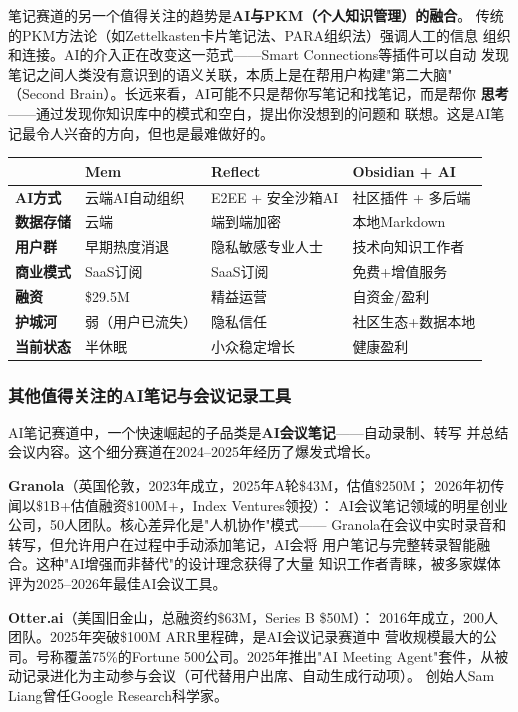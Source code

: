 笔记赛道的另一个值得关注的趋势是\textbf{AI与PKM（个人知识管理）的融合}。
传统的PKM方法论（如Zettelkasten卡片笔记法、PARA组织法）强调人工的信息
组织和连接。AI的介入正在改变这一范式——Smart Connections等插件可以自动
发现笔记之间人类没有意识到的语义关联，本质上是在帮用户构建"第二大脑"
（Second Brain）。长远来看，AI可能不只是帮你写笔记和找笔记，而是帮你
\textbf{思考}——通过发现你知识库中的模式和空白，提出你没想到的问题和
联想。这是AI笔记最令人兴奋的方向，但也是最难做好的。

\begin{keybox}[AI笔记工具对比]
\small
\begin{tabularx}{\textwidth}{l X X X}
\toprule
\rowcolor{figLightGray}
& \textbf{Mem} & \textbf{Reflect} & \textbf{Obsidian + AI} \\
\midrule
\textbf{AI方式} & 云端AI自动组织 & E2EE + 安全沙箱AI & 社区插件 + 多后端 \\
\textbf{数据存储} & 云端 & 端到端加密 & 本地Markdown \\
\textbf{用户群} & 早期热度消退 & 隐私敏感专业人士 & 技术向知识工作者 \\
\textbf{商业模式} & SaaS订阅 & SaaS订阅 & 免费+增值服务 \\
\textbf{融资} & \$29.5M & 精益运营 & 自资金/盈利 \\
\textbf{护城河} & 弱（用户已流失） & 隐私信任 & 社区生态+数据本地 \\
\textbf{当前状态} & 半休眠 & 小众稳定增长 & 健康盈利 \\
\bottomrule
\end{tabularx}
\end{keybox}

\subsubsection{其他值得关注的AI笔记与会议记录工具}

AI笔记赛道中，一个快速崛起的子品类是\textbf{AI会议笔记}——自动录制、转写
并总结会议内容。这个细分赛道在2024--2025年经历了爆发式增长。

\textbf{Granola}（英国伦敦，2023年成立，2025年A轮\$43M，估值\$250M；
2026年初传闻以\$1B+估值融资\$100M+，Index Ventures领投）：
AI会议笔记领域的明星创业公司，50人团队。核心差异化是"人机协作"模式——
Granola在会议中实时录音和转写，但允许用户在过程中手动添加笔记，AI会将
用户笔记与完整转录智能融合。这种"AI增强而非替代"的设计理念获得了大量
知识工作者青睐，被多家媒体评为2025--2026年最佳AI会议工具。

\textbf{Otter.ai}（美国旧金山，总融资约\$63M，Series B \$50M）：
2016年成立，200人团队。2025年突破\$100M ARR里程碑，是AI会议记录赛道中
营收规模最大的公司。号称覆盖75\%的Fortune 500公司。2025年推出"AI Meeting
Agent"套件，从被动记录进化为主动参与会议（可代替用户出席、自动生成行动项）。
创始人Sam Liang曾任Google Research科学家。

